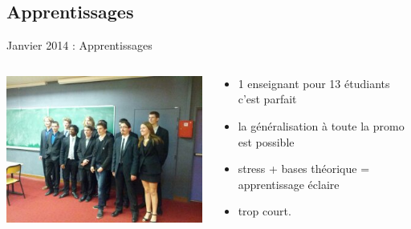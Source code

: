 \documentclass{beamer}
\begin{document}
\subsection{Apprentissages}
\begin{frame}{Janvier 2014 : Apprentissages}
  \begin{columns}
    \begin{column}{0.5\textwidth}
      \begin{center}
        \includegraphics[width=\textwidth]{includes/201401_soutenance.jpg}      
      \end{center}
    \end{column}
    \begin{column}{0.5\textwidth}
  \begin{itemize}
    \item 1 enseignant pour 13 étudiants c'est parfait
    \item la généralisation à toute la promo est possible
    \item stress + bases théorique = apprentissage éclaire
    \item trop court.
  \end{itemize}
    \end{column}
  \end{columns}
\end{frame}
\end{document}
